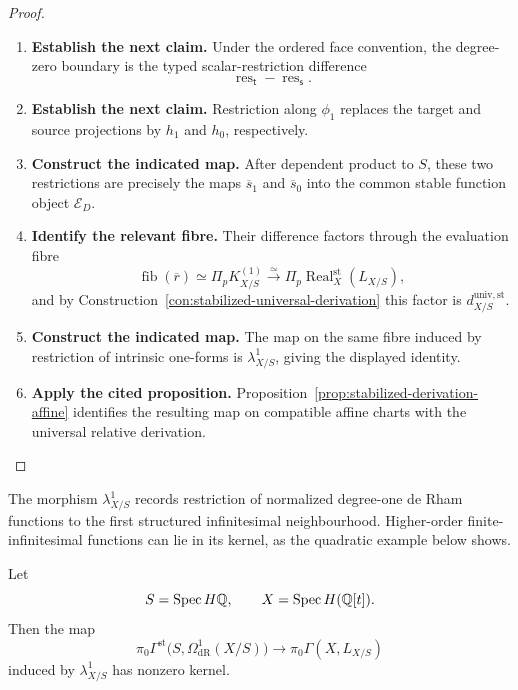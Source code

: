\begin{proof}
\leavevmode
\begin{enumerate}[label=\textup{(\arabic*)}]
    \item \textbf{Establish the next claim.}
    Under the ordered face convention, the degree-zero boundary is the typed
    scalar-restriction difference
    \[
    \operatorname{res}_{\mathsf t}-\operatorname{res}_{\mathsf s}.
    \]
    \item \textbf{Establish the next claim.}
    Restriction along \(\phi_1\) replaces the target and source projections by \(h_1\) and
    \(h_0\), respectively.
    \item \textbf{Construct the indicated map.}
    After dependent product to \(S\), these two restrictions are precisely
    the maps \(\overline s_1\) and \(\overline s_0\) into the common stable function
    object \(\mathscr E_D\).
    \item \textbf{Identify the relevant fibre.}
    Their difference factors through the evaluation fibre
    \[
    \operatorname{fib}(\overline r)
    \simeq
    \Pi_pK^{(1)}_{X/S}
    \xrightarrow{\simeq}
    \Pi_p\operatorname{Real}^{\mathrm{st}}_X(L_{X/S}),
    \]
    and by Construction~\ref{con:stabilized-universal-derivation} this factor is
    \(d^{\mathrm{univ,st}}_{X/S}\).
    \item \textbf{Construct the indicated map.}
    The map on the same fibre induced by restriction of
    intrinsic one-forms is \(\lambda^1_{X/S}\), giving the displayed identity.
    \item \textbf{Apply the cited proposition.}
    Proposition~\ref{prop:stabilized-derivation-affine} identifies the resulting map on
    compatible affine charts with the universal relative derivation.
\end{enumerate}
\end{proof}

\begin{remark}
The morphism \(\lambda^1_{X/S}\) records restriction of normalized
degree-one de Rham functions to the first structured infinitesimal neighbourhood. Higher-order
finite-infinitesimal functions can lie in its kernel, as the quadratic example below
shows.
\end{remark}

\begin{proposition}
\label{prop:higher-infinitesimal-terms}
Let
\[
  S=\operatorname{Spec} H\mathbb Q,
  \qquad
  X=\operatorname{Spec} H(\mathbb Q[t]).
\]
Then the map
\[
  \pi_0\Gamma^{\mathrm{st}}
  \bigl(S,\Omega^1_{\mathrm{dR}}(X/S)\bigr)
  \longrightarrow
  \pi_0\Gamma(X,L_{X/S})
\]
induced by \(\lambda^1_{X/S}\) has nonzero kernel.
\end{proposition}

